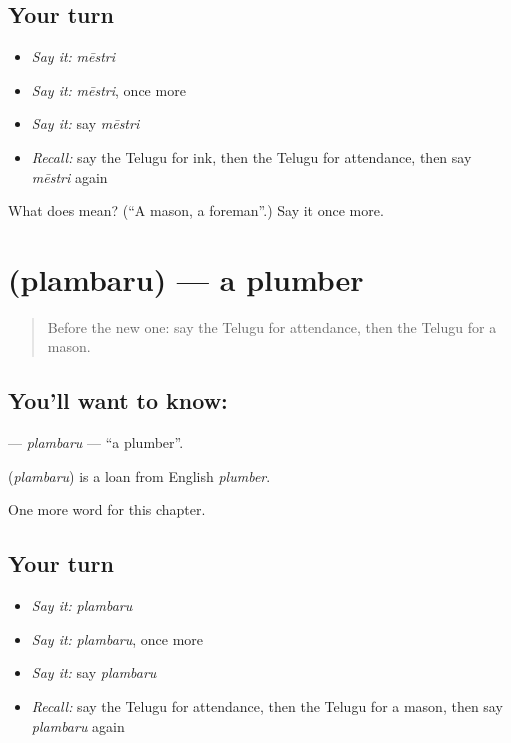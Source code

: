 \subsection*{Your turn}
\begin{itemize}
\raggedright
  \item \emph{Say it:} \emph{mēstri}
  \item \emph{Say it:} \emph{mēstri}, once more
  \item \emph{Say it:} say \emph{mēstri}
  \item \emph{Recall:} say the Telugu for ink, then the Telugu for attendance, then say \emph{mēstri} again
\end{itemize}

\begin{tcolorbox}[breakable,colback=teal!4,colframe=teal!35!black,title={Before you move on}]
What does  mean? (\textquotedblleft{}A mason, a foreman\textquotedblright{}.) Say it once more.
\end{tcolorbox}
\section[\texorpdfstring{\te{ప్లంబరు} (plambaru)}{ప్లంబరు (plambaru)}]{ (plambaru) — a plumber}

\label{lesson:TE-C314-plambaru}



\begin{quote}
Before the new one: say the Telugu for attendance, then the Telugu for a mason.
\end{quote}

\subsection*{You'll want to know: }
\textbf{} — \emph{plambaru} — \textquotedblleft{}a plumber\textquotedblright{}.

\begin{cousinweb}
\textbf{} (\emph{plambaru}) is a loan from English \emph{plumber}.
\end{cousinweb}

\begin{grammarlens}[title={What you've built}]
One more word for this chapter.
\end{grammarlens}

\subsection*{Your turn}
\begin{itemize}
\raggedright
  \item \emph{Say it:} \emph{plambaru}
  \item \emph{Say it:} \emph{plambaru}, once more
  \item \emph{Say it:} say \emph{plambaru}
  \item \emph{Recall:} say the Telugu for attendance, then the Telugu for a mason, then say \emph{plambaru} again
\end{itemize}

